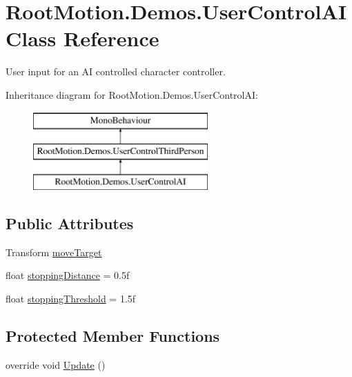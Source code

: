\hypertarget{class_root_motion_1_1_demos_1_1_user_control_a_i}{}\section{Root\+Motion.\+Demos.\+User\+Control\+AI Class Reference}
\label{class_root_motion_1_1_demos_1_1_user_control_a_i}


User input for an AI controlled character controller.  


Inheritance diagram for Root\+Motion.\+Demos.\+User\+Control\+AI\+:\begin{figure}[H]
\begin{center}
\leavevmode
\includegraphics[height=3.000000cm]{class_root_motion_1_1_demos_1_1_user_control_a_i}
\end{center}
\end{figure}
\subsection*{Public Attributes}
\begin{DoxyCompactItemize}
\item 
Transform \mbox{\hyperlink{class_root_motion_1_1_demos_1_1_user_control_a_i_a84735d68086c8534588cdae1052ddb9f}{move\+Target}}
\item 
float \mbox{\hyperlink{class_root_motion_1_1_demos_1_1_user_control_a_i_abeb9b0990f17c3becf91d74972a1bb31}{stopping\+Distance}} = 0.\+5f
\item 
float \mbox{\hyperlink{class_root_motion_1_1_demos_1_1_user_control_a_i_aa01a8c5552bbc8987d78df5c4be7f576}{stopping\+Threshold}} = 1.\+5f
\end{DoxyCompactItemize}
\subsection*{Protected Member Functions}
\begin{DoxyCompactItemize}
\item 
override void \mbox{\hyperlink{class_root_motion_1_1_demos_1_1_user_control_a_i_ab0d7ff405d38dd90d40941fd3d071762}{Update}} ()
\end{DoxyCompactItemize}
